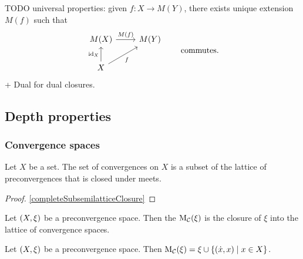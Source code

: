 TODO universal properties: given $f: X\to M(Y)$, there exists unique extension $M(f)$ such that
\[ \begin{tikzcd}
M(X) \ar[r, "M(f)"] & M(Y) \\
X \ar[u, "\id_X"] \ar[ur, swap, "f"] & {}
\end{tikzcd} \qquad \text{commutes.} \]
+ Dual for dual closures.

\subsection{Depth properties}
\subsubsection{Convergence spaces}
\begin{lemma}
Let $X$ be a set. The set of convergences on $X$ is a subset of the lattice of preconvergences that is closed under meets.
\end{lemma}
\begin{proof}
\ref{completeSubsemilatticeClosure}
\end{proof}

\begin{definition}
Let $\sSet{X,\xi}$ be a preconvergence space. Then the  $\operatorname{M_\mathcal{C}}(\xi)$ is the closure of $\xi$ into the lattice of convergence spaces.
\end{definition}

\begin{lemma} \label{convModConstruction}
Let $\sSet{X,\xi}$ be a preconvergence space. Then $\convMod(\xi) = \xi \cup \setbuilder{(\pfilter{x}, x)}{x\in X}$.
\end{lemma}

